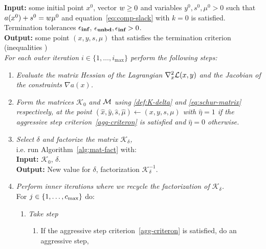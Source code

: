 \documentclass{article}
\begin{document}
\begin{algorithm}[H]
\textbf{Input:} some initial point $x^{0}$, vector $w \ge 0$ and variables $y^{0}, s^{0}, \mu^0 > 0$  such that $a(x^{0}) + s^{0} = w \mu^{0}$ and equation~\eqref{eq:comp-slack} with $k=0$ is satisfied. Termination tolerances $\epsilon_{\textbf{inf}}$, $\epsilon_{\textbf{unbd}}, \epsilon_{\textbf{inf}} > 0$. \\
\textbf{Output:} some point $(x, y, s, \mu)$ that satisfies the termination criterion (inequalities \termination{}) 
\vspace{0.1 cm} \\
\emph{For each outer iteration $i \in \{1, \dots, i_{\max}\}$ perform the following steps:}
\begin{enumerate}[label*=A.{\arabic*}]
\item \label{step-1}  \emph{Evaluate the matrix Hessian of the Lagrangian $\nabla^2_{x} \mathcal{L}(x,y)$ and the Jacobian of the constraints $\nabla a(x)$.}
\item \label{line:form-K}  \emph{Form the matrices $\mathcal{K}_{0}$ and $\mathcal{M}$ using \eqref{def:K-delta} and \eqref{eq:schur-matrix} respectively, at the point $(\hat{x}, \hat{y}, \hat{s}, \hat{\mu}) \gets (x, y, s, \mu)$ with $\hat{\eta} = 1$ if the aggressive step criterion~\eqref{agg-criteron} is satisfied and $\hat{\eta} = 0$ otherwise.}
\item \emph{Select $\delta$ and factorize the matrix $\mathcal{K}_{\delta}$,} \\
i.e. run Algorithm~\ref{alg:mat-fact} with: \\
\hspace*{0.1cm}  \textbf{Input:} $\mathcal{K}_{0}$, $\delta$. \\
\hspace*{0.1cm} \textbf{Output:} New value for $\delta$, factorization $\mathcal{K}_{\delta}^{-1}$.
\item \label{take-steps}  \emph{Perform inner iterations where we recycle the factorization of $\mathcal{K}_{\delta}$.} \\
For $j \in \{ 1, \dots , c_{\max} \}$ do:
\begin{enumerate}[label*=.{\arabic*}]
\item \emph{Take step}\label{line:take-step}
\begin{enumerate}[label=-Case-{\Roman*}]
\item If the aggressive step criterion~\eqref{agg-criteron} is satisfied, do an aggressive step, \\

\end{enumerate}
\end{enumerate}
\end{enumerate}
\end{algorithm}
\end{document}
